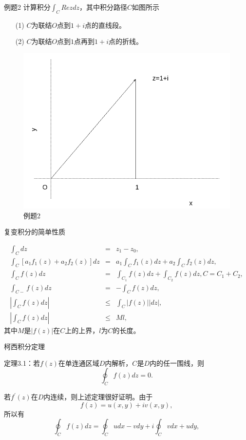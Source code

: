 \documentclass[11pt]{beamer}
\begin{document}
\begin{frame}{例题2}
计算积分$\int_C Re z dz$，其中积分路径$C$如图所示
\begin{itemize}
	\item [(1)] $C$为联结$O$点到$1+i$点的直线段。
	\item [(2)] $C$为联结$O$点到$1$点再到$1+i$点的折线。
\end{itemize}
\begin{figure}
	\centering
	\includegraphics[width=0.7\linewidth]{chap3_example2}
	\caption{例题2}
	\label{fig:chap3example2}
\end{figure}

\end{frame}

\begin{frame}{复变积分的简单性质}

\begin{eqnarray}
\int_C dz &=& z_1 - z_0, \\
\int_C [a_1 f_1(z) + a_2 f_2(z)] dz
 &=& a_1 \int_C f_1(z) dz + a_2 \int_C f_2(z) dz, \\
\int_C f(z)dz &=& \int_{C_1} f(z)dz + \int_{C_2} f(z) dz, C = C_1 + C_2, \\
\int_{C-} f(z) dz &=& - \int_C f(z) dz, \\
|\int_C f(z)  dz| &\leq& \int_C |f(z)| |dz|, \\
|\int_C f(z) dz | &\leq& Ml, 
\end{eqnarray}
其中$M$是$|f(z)|$在$C$上的上界，$l$为$C$的长度。

\end{frame}

\begin{frame}{柯西积分定理}

定理3.1：若$f(z)$在单连通区域$D$内解析，$C$是$D$内的任一围线，则
\begin{equation}
\oint_C f(z) dz = 0.
\end{equation}

若$f^\prime(z)$在$D$内连续，则上述定理很好证明。由于
\begin{equation}
f(z) = u(x,y) + iv(x,y),
\end{equation}
所以有
\begin{equation}
\oint_C f(z) dz = \oint_C udx - vdy + i\oint_C vdx + udy,
\end{equation}
\end{frame}
\end{document}
